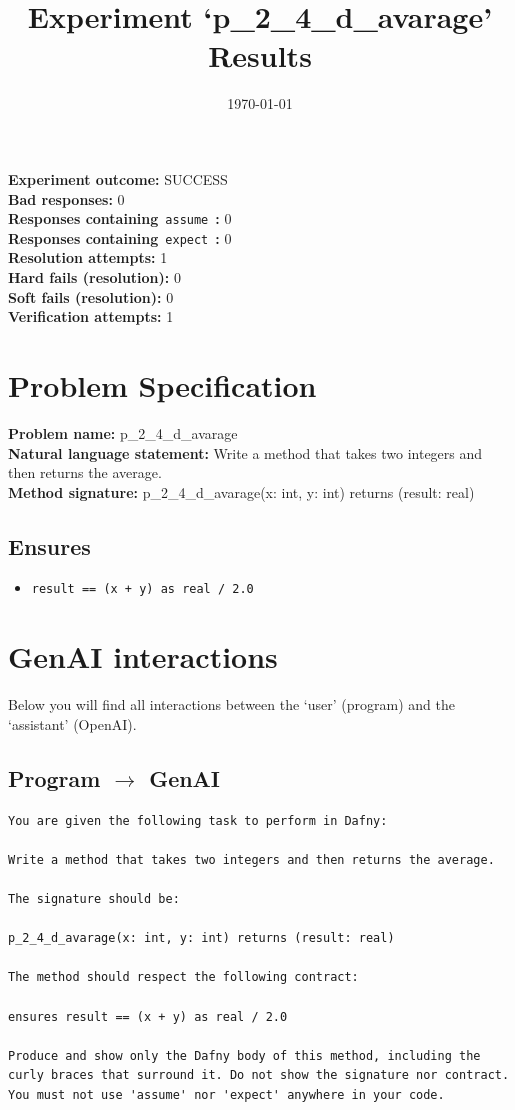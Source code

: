 \documentclass{article}
\begin{document}
\title{Experiment `p\_2\_4\_d\_avarage' Results}
\author{\today}
\date{}
\maketitle
\textbf{Experiment outcome: }SUCCESS
\\\textbf{Bad responses: }0
\\\textbf{Responses containing}~\texttt{assume}~\textbf{: }0
\\\textbf{Responses containing}~\texttt{expect}~\textbf{: }0
\\\textbf{Resolution attempts: }1
\\\textbf{Hard fails (resolution): }0
\\\textbf{Soft fails (resolution): }0
\\\textbf{Verification attempts: }1
\section*{Problem Specification}
\textbf{Problem name: }p\_2\_4\_d\_avarage
\\\textbf{Natural language statement: }Write a method that takes two integers and then returns the average.
\\\textbf{Method signature: }p\_2\_4\_d\_avarage(x: int, y: int) returns (result: real)
\subsection*{Ensures}
\begin{itemize}
\item \texttt{result == (x + y) as real / 2.0}
\end{itemize}
\clearpage
\section*{GenAI interactions}
Below you will find all interactions between the `user' (program) and the `assistant' (OpenAI).
\subsection*{Program $\rightarrow$ GenAI}
\begin{lstlisting}
You are given the following task to perform in Dafny:

Write a method that takes two integers and then returns the average.

The signature should be:

p_2_4_d_avarage(x: int, y: int) returns (result: real)

The method should respect the following contract:

ensures result == (x + y) as real / 2.0

Produce and show only the Dafny body of this method, including the curly braces that surround it. Do not show the signature nor contract. You must not use 'assume' nor 'expect' anywhere in your code.
\end{lstlisting}
\end{document}
